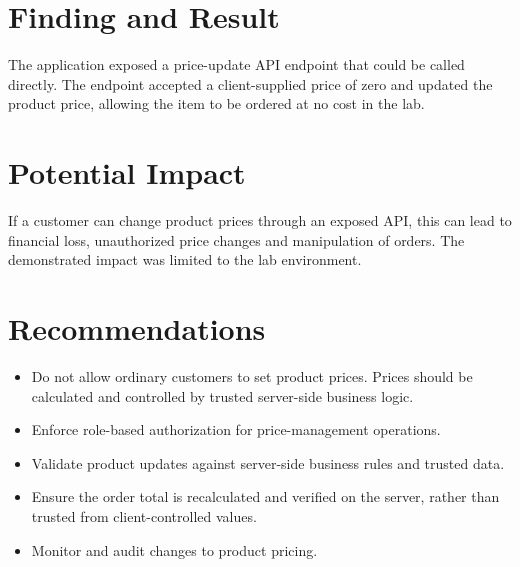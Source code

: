 \documentclass[11pt,a4paper]{article}
\begin{document}
\section{Finding and Result}
The application exposed a price-update API endpoint that could be called directly. The endpoint accepted a client-supplied price of zero and updated the product price, allowing the item to be ordered at no cost in the lab.
\section{Potential Impact}
If a customer can change product prices through an exposed API, this can lead to financial loss, unauthorized price changes and manipulation of orders. The demonstrated impact was limited to the lab environment.
\section{Recommendations}
\begin{itemize}
\item Do not allow ordinary customers to set product prices. Prices should be calculated and controlled by trusted server-side business logic.
\item Enforce role-based authorization for price-management operations.
\item Validate product updates against server-side business rules and trusted data.
\item Ensure the order total is recalculated and verified on the server, rather than trusted from client-controlled values.
\item Monitor and audit changes to product pricing.
\end{itemize}
\end{document}

